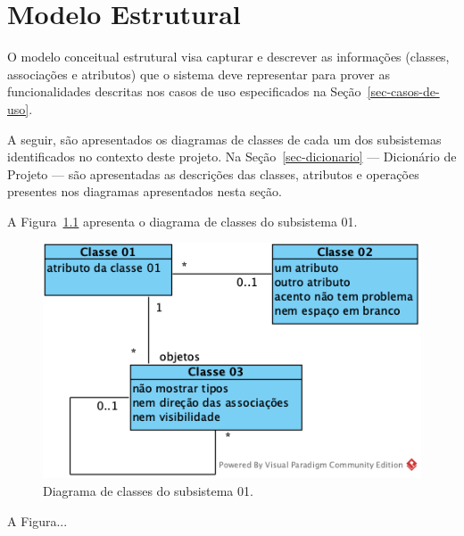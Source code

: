 \chapter{Modelo Estrutural}
\label{sec-modelo-estrutural}
\vspace{-1cm}

O modelo conceitual estrutural visa capturar e descrever as informações (classes, associações e atributos) que o sistema deve representar para prover as funcionalidades descritas nos casos de uso especificados na Seção~\ref{sec-casos-de-uso}. 

A seguir, são apresentados os diagramas de classes de cada um dos subsistemas identificados no contexto deste projeto. Na Seção~\ref{sec-dicionario} --- Dicionário de Projeto --- são apresentadas as descrições das classes, atributos e operações presentes nos diagramas apresentados nesta seção.


A Figura~\ref{fig-modelo-estrutural-subsistema-01} apresenta o diagrama de classes do subsistema 01.

\begin{figure}
	\centering
	\includegraphics[width=.7\textwidth]{figuras/fig-modelo-estrutural-subsistema-01.png}
	\caption{Diagrama de classes do subsistema 01.}
	\label{fig-modelo-estrutural-subsistema-01}
\end{figure} 


A Figura...

